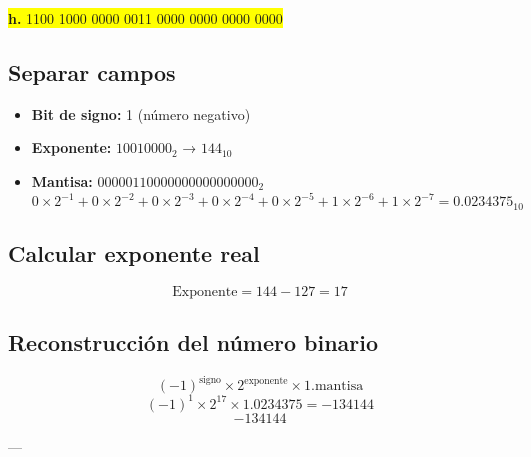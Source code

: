 \documentclass[a4paper,12pt]{article}
\begin{document}
	\newpage
	\begin{center}
		\colorbox{yellow}{\textbf{h.} 1100 1000 0000 0011 0000 0000 0000 0000}
		
		\subsection*{Separar campos}
		
		\begin{itemize}
			\item \textbf{Bit de signo:} 1 (número negativo)
			\item \textbf{Exponente:} $10010000_2$ → $144_{10}$
			\item \textbf{Mantisa:} $00000110000000000000000_2$ 
			\[
			0\times2^{-1} + 0\times2^{-2} + 0\times2^{-3} + 0\times2^{-4} + 0\times2^{-5} + 1\times2^{-6} + 1\times2^{-7} = 0.0234375_{10}
			\]
		\end{itemize}
		
		\subsection*{Calcular exponente real}
		
		\[
		\text{Exponente} = 144 - 127 = 17
		\]
		
		
		
		\subsection*{Reconstrucción del número binario}	
		\[
		(-1)^{\text{signo}} \times 2^{\text{exponente}} \times 1.\text{mantisa}
		\]
		\[
		(-1)^1 \times 2^17 \times 1.0234375 = -134144
		\]
		\vspace{1em}
		\[
		\boxed{-134144}
		\]
		
		---
	\end{center}
\end{document}
